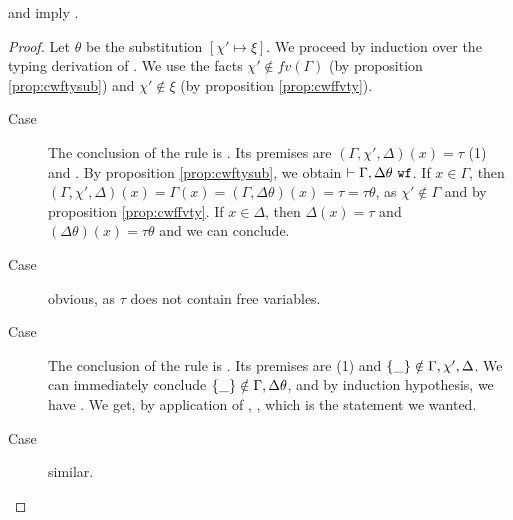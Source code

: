 \documentclass[a4paper]{article}
\begin{document}
\begin{lem}
  \newcommand{\thesub}[1]{\tsub{#1}{\chi' \mapsto \xi}} 
  \label{lem:typesubst}
   and \ctwf{\Gamma}{\xi} imply 
  \typerel{\Gamma,\thesub{\Delta}}{\thesub{e}}{\thesub{\tau}}{\thesub{\varepsilon}}.
\end{lem}
\begin{proof}
  Let $\theta$ be the substitution $\left[ \chi'\mapsto \xi \right]$.
  \newcommand{\thesub}[1]{\ensuremath{#1 \theta}}
  We proceed by induction over the typing derivation of
  .  We use the facts $\chi'\notin fv(\Gamma)$ (by
  proposition \ref{prop:cwftysub}) and $\chi'\notin\xi$ (by proposition
  \ref{prop:cwffvty}).
  \begin{description}

    \item[Case \varrule] The conclusion of the rule is
      . Its premises are $(\Gamma,\chi',\Delta)(x) = \tau$
      (1) and . By proposition \ref{prop:cwftysub}, we obtain
      $\cwf{\Gamma,\thesub{\Delta}}$. If $x\in \Gamma$, then $(\Gamma,\chi',\Delta)(x) = \Gamma(x) =
      (\Gamma,\thesub{\Delta})(x) = \tau = \thesub{\tau}$, as $\chi'\notin \Gamma$ and by proposition
      \ref{prop:cwffvty}. If $x\in \Delta$, then $\Delta(x) = \tau$ and $(\thesub{\Delta})(x) =
      \thesub{\tau}$ and we can conclude.

    \item[Case \conrule] obvious, as $\tau$ does not contain free variables. 

    \item[Case \absrule] The conclusion of the rule is . Its premises are
       (1) and $\left\{ \_ \right\} \notin \Gamma,\chi',\Delta$.  We
      can immediately conclude $\capreg{\_} \notin \Gamma,\thesub{\Delta}$, and by
      induction hypothesis, we have
      \typerel{\Gamma,\thesub{\Delta},x:\thesub{\tau'}}{\thesub{e}}{\thesub{\tau}}{\varepsilon}.  We
      get, by application of \absrule{}, \typerel{\Gamma,\thesub{\Delta}}{\thesub{(\lambda
      x:\tau'.e)}}{\thesub{(\tau'\effarr{\varepsilon} \tau)}}{\emptyset}, which is the statement
      we wanted.

    \item[Case \recrule] similar. 
      

\end{description}
\end{proof}
\end{document}
